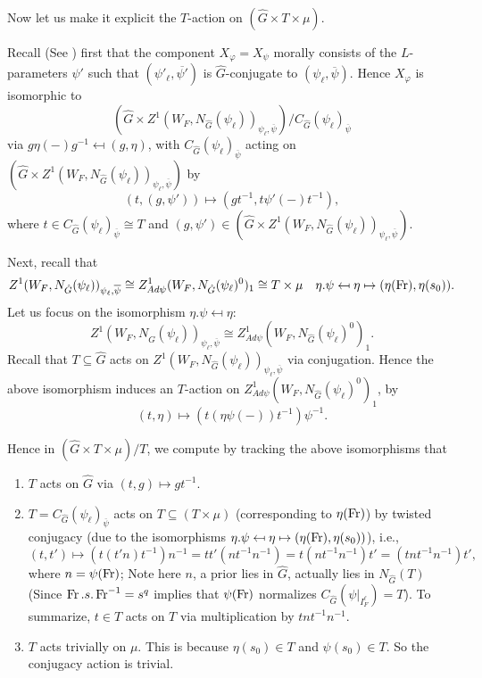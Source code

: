 Now let us make it explicit the $T$-action on $(\hat{G} \times T \times \mu)$.

Recall (See \cite[Subsection 4.6]{dat2022ihes}) first that the component $X_{\varphi}=X_{\psi}$ morally consists of the $L$-parameters $\psi'$ such that $(\psi'_{\ell}, \overline{\psi'})$ is $\hat{G}$-conjugate to $(\psi_{\ell}, \overline{\psi})$. Hence $X_{\varphi}$ is isomorphic to 
$$(\hat{G} \times Z^1(W_F, N_{\hat{G}}(\psi_{\ell}))_{\psi_{\ell}, \overline{\psi}})/C_{\hat{G}}(\psi_{\ell})_{\overline{\psi}}$$
via $g\eta(-)g^{-1} \mapsfrom (g, \eta)$, with $C_{\hat{G}}(\psi_{\ell})_{\overline{\psi}}$ acting on $(\hat{G} \times Z^1(W_F, N_{\hat{G}}(\psi_{\ell}))_{\psi_{\ell}, \overline{\psi}})$ by 
$$(t, (g, \psi')) \mapsto (gt^{-1}, t\psi'(-)t^{-1}),$$
where $t \in C_{\hat{G}}(\psi_{\ell})_{\overline{\psi}} \cong T$ and $(g, \psi') \in (\hat{G} \times Z^1(W_F, N_{\hat{G}}(\psi_{\ell}))_{\psi_{\ell}, \overline{\psi}})$.

Next, recall that 
$$Z^1(W_F, N_{\hat{G}}(\psi_{\ell}))_{\psi_{\ell}, \overline{\psi}} \cong Z^1_{Ad\psi}(W_F, N_{\hat{G}}(\psi_{\ell})^0)_1 \cong T \times \mu \quad \eta.\psi \mapsfrom \eta \mapsto (\eta(\operatorname{Fr}), \eta(s_0)).$$
Let us focus on the isomorphism $\eta.\psi \mapsfrom \eta$:
$$Z^1(W_F, N_{\hat{G}}(\psi_{\ell}))_{\psi_{\ell}, \overline{\psi}} \cong Z^1_{Ad\psi}(W_F, N_{\hat{G}}(\psi_{\ell})^0)_1.$$
Recall that $T \subseteq \hat{G}$ acts on $Z^1(W_F, N_{\hat{G}}(\psi_{\ell}))_{\psi_{\ell}, \overline{\psi}}$ via conjugation. Hence the above isomorphism induces an $T$-action on $Z^1_{Ad\psi}(W_F, N_{\hat{G}}(\psi_{\ell})^0)_1$, by
$$(t, \eta) \mapsto (t(\eta\psi(-)) t^{-1})\psi^{-1}.$$

Hence in $(\hat{G} \times T \times \mu)/T$, we compute by tracking the above isomorphisms that 
\begin{enumerate}
	\item $T$ acts on $\hat{G}$ via $(t, g) \mapsto gt^{-1}$.
	\item $T=C_{\hat{G}}(\psi_{\ell})_{\overline{\psi}}$ acts on $T \subseteq (T \times \mu)$ (corresponding to $\eta(\operatorname{Fr})$) by twisted conjugacy (due to the isomorphisms $\eta.\psi \mapsfrom \eta \mapsto (\eta(\operatorname{Fr}), \eta(s_0))$), i.e., 
	$$(t, t') \mapsto \left(t(t'n)t^{-1}\right)n^{-1}=tt'(nt^{-1}n^{-1})=t(nt^{-1}n^{-1})t'=(tnt^{-1}n^{-1})t',$$
	where $n=\psi(\operatorname{Fr})$; Note here $n$, a prior lies in $\hat{G}$, actually lies in $N_{\hat{G}}(T)$ (Since $\operatorname{Fr}.s.\operatorname{Fr}^{-1}=s^q$ implies that $\psi(\operatorname{Fr})$ normalizes $C_{\hat{G}}(\psi|_{I_F^{\ell}})=T$). To summarize, $t \in T$ acts on $T$ via multiplication by $tnt^{-1}n^{-1}$.
	\item $T$ acts trivially on $\mu$. This is because $\eta(s_0) \in T$ and $\psi(s_0) \in T$. So the conjugacy action is trivial.
\end{enumerate}

